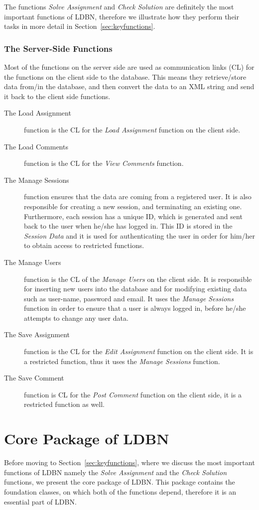The functions \textit{Solve Assignment} and \textit{Check Solution} are definitely the most 
important functions of LDBN, therefore we illustrate how they perform their tasks
in more detail in Section~\ref{sec:keyfunctions}. 

\subsubsection{The Server-Side Functions}
Most of the functions on the server side are used as communication links (CL) for the
functions on the client side to the database. This means they retrieve/store data from/in the 
database, and then convert the data to an XML string and send it back to the client side
functions. 

\begin{description}
	\item[The Load Assignment] function is the CL for the \textit{Load Assignment} function on the 
		client side.
	\item[The Load Comments] function is the CL for the \textit{View Comments} function.
	\item[The Manage Sessions] function ensures that the data are coming from a registered user.
		It is also responsible for creating a new session, and terminating an existing one. Furthermore,
		each session has a unique ID, which is generated and sent back to the user 
		when he/she has logged in. This ID is stored in the \textit{Session Data} and it is used for
		authenticating the user in order for him/her to obtain access to restricted functions.
	\item[The Manage Users] function is the CL of the \textit{Manage Users} on the client side.
		It is responsible 
		for inserting new users into the database and for modifying existing data such as 
		user-name, password and email.
		It uses the \textit{Manage Sessions} function in order to ensure that a
		user is always logged in, before he/she attempts to change any user data.  
	\item[The Save Assignment] function is the CL for the \textit{Edit Assignment} function on the client side. 
		It is a restricted function, thus it uses the \textit{Manage Sessions} function. 
	\item[The Save Comment] function is CL for the \textit{Post Comment} function on the client side, it is 
		a restricted function as well.
\end{description} 

\section{Core Package of LDBN}
\label{sec:corepk}
Before moving to Section~\ref{sec:keyfunctions}, where we discuss the most important functions of 
LDBN namely the \textit{Solve Assignment} and the \textit{Check Solution} functions, 
we present the core package of LDBN. This package contains the foundation 
classes, on which both of the functions depend, therefore it is an essential 
part of LDBN. 

